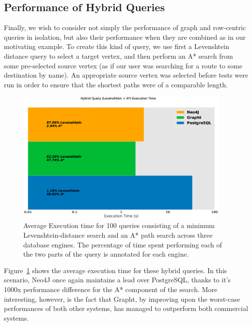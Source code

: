 \subsection{Performance of Hybrid Queries} %
\label{sub:performance_of_hybrid_queries}

Finally, we wish to consider not simply the performance of graph and row-centric queries in isolation, but also their performance when they are combined as in our
motivating example. To create this kind of query, we use first a Levenshtein
distance query to select a target vertex, and then perform an A* search from
some pre-selected source vertex (as if our user was searching for a route to
some destination by name). An appropriate source vertex was selected before
tests were run in order to ensure that the shortest paths were of a comparable
length.

\begin{figure}[htbp]
	\centering
	\includegraphics[width=0.95\textwidth]{figs/hybridgraph.eps}
	\caption{Average Execution time for 100 queries consisting of a minimum Levenshtein-distance search and an A* path search across three database engines. The percentage of time
	spent performing each of the two parts of the query is annotated for each engine.}
	\label{fig:hybridgraph}
\end{figure}

Figure~\ref{fig:hybridgraph} shows the average execution time for these hybrid
queries. In this scenario, Neo4J once again maintains a lead over PostgreSQL,
thanks to it's 1000x performance difference for the A* component of the search. More interesting, however,
is the fact that Grapht, by improving upon the worst-case performances of both
other systems, has managed to outperform both commercial systems. 

